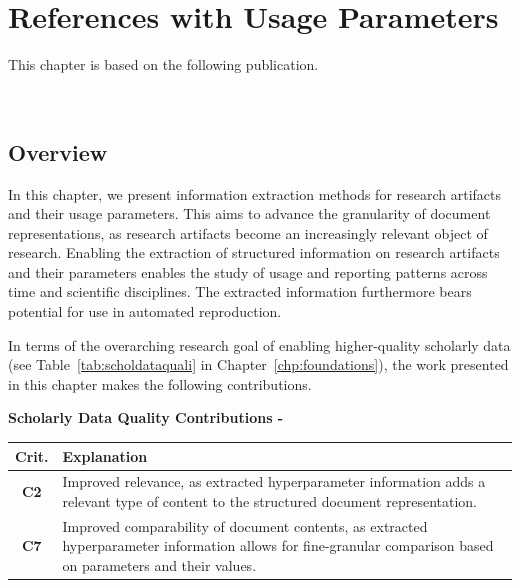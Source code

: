 \chapter{References with Usage Parameters}
\label{chp:params}

This chapter is based on the following publication.
\begin{infobox-pub}
\\
\end{infobox-pub}

\section{Overview}
In this chapter, we present information extraction methods for research artifacts and their usage parameters. This aims to advance the granularity of document representations, as research artifacts become an increasingly relevant object of research. Enabling the extraction of structured information on research artifacts and their parameters enables the study of usage and reporting patterns across time and scientific disciplines. The extracted information furthermore bears potential for use in automated reproduction.

In terms of the overarching research goal of enabling higher-quality scholarly data (see Table~\ref{tab:scholdataquali} in Chapter~\ref{chp:foundations}), the work presented in this chapter makes the following contributions.

\begin{infobox-progress}
      \textbf{Scholarly Data Quality Contributions - \cite{Saier2023hyperpie}}

      \begin{tabular}{cp{11.3cm}}
        \toprule
        Crit. & Explanation \\
        \midrule
        \textbf{C2} & Improved relevance, as extracted hyperparameter information adds a relevant type of content to the structured document representation. \\
        \textbf{C7} & Improved comparability of document contents, as extracted hyperparameter information allows for fine-granular comparison based on parameters and their values. \\
        \bottomrule
      \end{tabular}
\end{infobox-progress}

